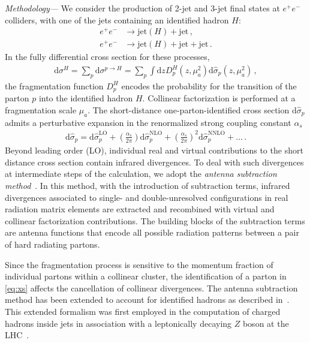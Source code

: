 \documentclass[10pt,aps,prl,twocolumn,preprintnumbers,nofootinbib]{revtex4-2}
\newcommand{\dd}{\mathrm{d}}
\newcommand{\jet}{\mathrm{jet}}
\begin{document}
\textit{Methodology---}\ignorespaces
We consider the production of 2-jet and 3-jet final states at $e^+e^-$ colliders, with one of the jets containing
an identified hadron $H$:
\begin{align}\label{eq:proc}
  e^+e^-& \to \jet(H)+\jet
  \, , \nonumber \\
  e^+e^-& \to \jet(H)+\jet + \jet
  \, .
\end{align}
In the fully differential cross section for these processes,
\begin{align}\label{eq:xs}
\dd\sigma^H=\sum_p\dd\sigma^{p\to H} = \sum_p \int\dd z D^H_p(z,\mu_a^2)\dd \hat{\sigma}_p(z,\mu_a^2) \, ,
\end{align}
the fragmentation function $D_p^H$ encodes the probability for the transition of the parton $p$ into the identified hadron $H$.
Collinear factorization is performed at a fragmentation scale $\mu_a$.
The short-distance one-parton-identified cross section $\dd \hat{\sigma}_p$ admits a perturbative expansion in the renormalized strong coupling constant $\alpha_s$
\begin{align}
\dd \hat{\sigma}_p = \dd \hat{\sigma}^{\mathrm{LO}}_p+\left(\frac{\alpha_s}{2\pi}\right) \dd \hat{\sigma}^{\mathrm{NLO}}_p+\left(\frac{\alpha_s}{2\pi}\right)^2 \dd \hat{\sigma}^{\mathrm{NNLO}}_p+\ldots \, .
\end{align}
Beyond leading order (LO), individual real and virtual contributions to the short distance
cross section contain infrared divergences.
To deal with such divergences at intermediate steps of the calculation, we adopt the \textit{antenna subtraction method}~\cite{Gehrmann-DeRidder:2005btv,Currie:2013vh}.
In this method, with the introduction of subtraction terms, infrared divergences associated to single- and double-unresolved configurations in real radiation matrix elements are extracted and recombined with virtual and collinear factorization contributions.
The building blocks of the subtraction terms are antenna functions that encode all possible radiation patterns between a pair of hard radiating partons.

Since the fragmentation process is sensitive to the momentum fraction of individual partons within a collinear cluster, the identification of a parton in \eqref{eq:xs} affects the cancellation of collinear divergences.
The antenna subtraction method has been extended to account for identified hadrons as described in~\cite{Gehrmann:2022cih,Gehrmann:2022pzd,Bonino:2024adk}.
This extended formalism was first employed in the computation of charged hadrons inside jets in association with a leptonically decaying $Z$ boson at the LHC~\cite{Caletti:2024xaw}.
\end{document}
